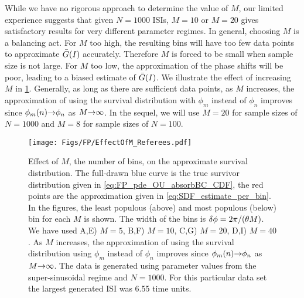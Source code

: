 While we have no rigorous approach to determine the value of $M$, our limited
experience suggests that given $N=1000$ ISIs, $M=10$ or $M=20$ gives satisfactory
results for very different parameter regimes. In general, choosing $M$ is a
balancing act. For $M$ too high, the resulting bins will have too few data
points to approximate ${ \bar{G} }(I)$ accurately. Therefore $M$ is forced to be small
when sample size is not large. For $M$ too low, the approximation of the phase
shifts will be poor, leading to a biased estimate of ${ \bar{G} }(I)$. We illustrate the
effect of increasing $M$ in \cref{fig:effect_of_M}. Generally, as long as there
are sufficient data points, as $M$ increases, the approximation of using the
survival distribution with $\phi_m$ instead of $\phi_n$ improves since
$\phi_m(n) {\rightarrow} \phi_n$ as $M {\rightarrow} \infty$. In the sequel, we will use $M=20$ for
sample sizes of $N=1000$ and $M=8$ for sample sizes of $N=100$.

\begin{figure}[h]
\begin{center}
\texttt{[image: Figs/FP/EffectOfM\_Referees.pdf]}
\caption{Effect of $M$, the number of bins, on the approximate survival
distribution. The full-drawn blue curve is the true survivor distribution
given in \cref{eq:FP_pde_OU_absorbBC_CDF}, the red points are the approximation
given in \cref{eq:SDF_estimate_per_bin}.  
In the figures, the least populous (above) and most populous (below) bin for
each $M$ is shown. The width of the bins is ${ \delta \phi } = {2\pi}/{({ \theta} M)}$.
We have used A,E) $M=5$, B,F) $M=10$, C,G) $M=20$,
D,I) $M=40$. As $M$ increases, the approximation of using the survival
distribution using $\phi_m$ instead of $\phi_n$ improves since $\phi_m(n) {\rightarrow}
\phi_n$ as $M {\rightarrow} \infty$. The data is generated using parameter
values from the super-sinusoidal regime and $N=1000$. For this
particular data set the largest generated ISI was 6.55 time units.}
\label{fig:effect_of_M}
\end{center}
\end{figure}

